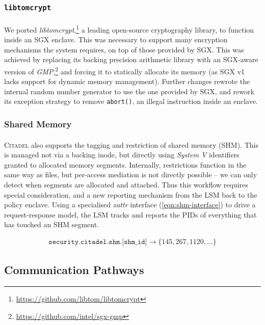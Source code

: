 \subsubsection{\texttt{libtomcrypt}}
\paragraph{} We ported \textit{libtomcrypt},\footnote{\url{https://github.com/libtom/libtomcrypt}} a leading open-source cryptography library, to function inside an SGX enclave. This was necessary to support many encryption mechanisms the system requires, on top of those provided by SGX. This was achieved by replacing its backing precision arithmetic library with an SGX-aware version of \textit{GMP},\footnote{\url{https://github.com/intel/sgx-gmp}} and forcing it to statically allocate its memory (as SGX v1 lacks support for dynamic memory management). Further changes rewrote the internal random number generator to use the one provided by SGX, and rework its exception strategy to remove \texttt{abort()}, an illegal instruction inside an enclave.

\subsubsection{Shared Memory}
\label{sec:shm}
\paragraph{} \textsc{Citadel} also supports the tagging and restriction of shared memory (SHM). This is managed not via a backing inode, but directly using \textit{System V} identifiers granted to allocated memory segments. Internally, restrictions function in the same way as files, but per-access mediation is not directly possible -- we can only detect when segments are allocated and attached. Thus this workflow requires special consideration, and a new reporting mechanism from the LSM back to the policy enclave. Using a specialised \textit{xattr} interface (\ref{eqn:shm-interface}) to drive a request-response model, the LSM tracks and reports the PIDs of everything that has touched an SHM segment. 

\vspace{-5mm}
\begin{align}
    \texttt{security.citadel.shm.[shm\_id]} \rightarrow \{145, 267, 1120, ...\} \label{eqn:shm-interface}
\end{align}

\subsection{Communication Pathways}
\label{sec:interdomain-comms}
